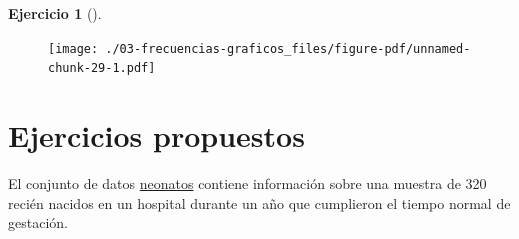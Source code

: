 \documentclass[
  a4paper,
]{scrreport}
\theoremstyle{definition}
\newtheorem{exercise}{Ejercicio}[chapter]
\theoremstyle{remark}
\begin{document}
\begin{exercise}[]
\begin{tcolorbox}
\begin{figure}[H]

{\centering \texttt{[image: ./03-frecuencias-graficos\_files/figure-pdf/unnamed-chunk-29-1.pdf]}

}

\end{figure}

\end{tcolorbox}

\end{exercise}

\hypertarget{ejercicios-propuestos-1}{%
\section{Ejercicios propuestos}\label{ejercicios-propuestos-1}}

El conjunto de datos \href{datos/neonatos.csv}{neonatos} contiene
información sobre una muestra de 320 recién nacidos en un hospital
durante un año que cumplieron el tiempo normal de gestación.
\end{document}
